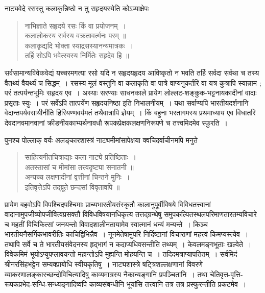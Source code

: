 {\dev नाट्यवेदे रसस्तु कलाकृन्निष्ठो न तु सहृदयस्येति कोऽप्याक्षेपः}
\begin{quote}
{\dev नाभिज्ञाते सहृदये रसः किं वा प्रयोजनम्~।}\\
{\dev कलालोकस्य सर्वस्य वक्रतावर्त्मनः परम् ॥}\\[5pt]
{\dev कलाकृद्यदि भोक्ता स्याद्रसस्यानन्यमात्रकः~।}\\
{\dev तर्हि सोऽपि भवेत्स्वस्य निर्मितेः सहृदेव हि ॥}
\end{quote}

{\dev सर्वसामान्यविवेकवेद्यं यच्चरमगत्या रसो यदि न सहृदयहृदय आविष्कृतो न भवति तर्हि सर्वदा सर्वथा च तस्य वैतथ्यं वैयर्थ्यं च सिद्धम्~। रसस्य मूलं वस्तुनि वा कलाकृति वा पात्रे वाप्यनुकर्तरि वा  यत्र कुत्रापि स्यान्नाम ; परं तत्पर्यन्तभूमिः सहृदय एव~। अस्याः सरण्याः साधनकाले प्रायेण लोल्लट-शङ्कुक-भट्टनायकादीनां वादाः प्रसृताः स्युः~। परं सर्वेऽपि तात्पर्येण सहृदयनिष्ठा इति निभालनीयम्~। यथा सर्वाण्यपि भारतीयदर्शनानि वेदान्तपर्यवसायीनीति हिरियण्णवर्यमतं तथैवात्रापि ज्ञेयम्~। किं बहुना भरतागमस्य प्रथमाध्याय एव विधातरि देवदानवमानवानां क्रीडनीयकाभ्यर्थनावधौ रूपकप्रेक्षकलक्षणनिरूपणे च तत्त्वमिदमेव स्फुरति~।}

{\dev पुनश्च पोल्लाक् वर्यः अलङ्कारशास्त्रं नाट्यमीमांसापेक्षया क्वचिदर्वाचीनमपि मनुते}
\begin{quote}
{\dev साहित्यगीतचित्राद्याः कला नाट्ये प्रतिष्ठिताः~।}\\
{\dev अतस्तासां च मीमांसा तत्त्वदृष्ट्या सनातनी ॥}\\[5pt]
{\dev अन्यच्च लक्षणादीनां वृत्तीनां चिन्तने मुनिः~।}\\
{\dev इतिवृत्तेऽपि तद्ब्रूते छन्दसां विवृतावपि ॥}
\end{quote}

{\dev प्रायेण बहवोऽपि विपश्चिदपश्चिमाः प्राच्यभारतीयसंस्कृतौ कालानुपूर्वीविषये विविधतत्त्वानां वादानामुपजीव्योपजीवित्वप्रसक्तौ विविधविषयानधिकृत्य तत्तद्ग्रन्थेषु समुपकल्पितस्थलपरि\-माणतारतम्यविचारे च महतीं विचिकित्सां जनयन्तो विवादशालीनतायामेव स्वात्मानं धन्यं मन्यन्ते~। किञ्च भारतीयनैसर्गिकभावरीतिः काचिद्विभिन्नैव~। नूनमेतेषामुपरि निर्दिष्टानां विचा\-राणां महत्त्वं किमप्यस्त्येव~। तथापि सर्वे च ते भारतीयसंवेदनस्य हृद्भागं न कदाप्यधिवसन्तीति तथ्यम्~। केवलमङ्गभूताः खल्वेते~। विवेकमिमं भूयोऽप्युपप्लावयन्तो महान्तोऽपि मुह्यन्ति मोहयन्ति च~। तदिदमत्राप्यापतितम्~। सर्वमिदं श्रीनरसिंहभट्टेन सम्यक्प्राबोधि स्वीयकृतिषु~। नाट्यशास्त्रे षट्त्रिशल्लक्षणानां विवरणे व्याकरणालङ्कारच्छन्दोविचित्यादिषु काव्यमात्रस्य नैका\-न्यङ्गानि प्रपञ्चितानि~। तथा चेतिवृत्त-वृत्ति-रूपकप्रभेद-सन्धि-सन्ध्यङ्गादिष्वपि काव्यसंबन्धीनि भूयांसि तत्त्वानि तत्र तत्र प्रस्फुरन्तीति प्रकटमेव~।} 

